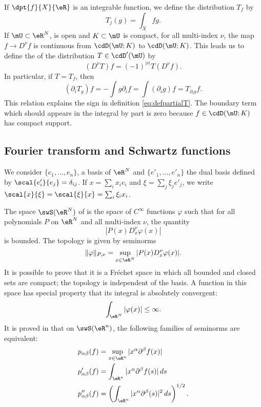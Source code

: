 If $\dpt{f}{X}{\eR}$ is an integrable function, we define the distribution $T_f$ by 
\[
	T_j(g)=\int_Xfg.
\]
If $\mU\subset\eR^N$, is open and $K\subset\mU$ is compact, for all multi-index $\nu$, the map $f\to D^{\nu}f$ is continuous from $\cdD(\mU;K)$ to $\cdD(\mU;K)$. This leads us to define the  of the distribution $T\in\cdD'(\mU)$ by
\begin{equation} \label{eq:defpartialT}
	(D^{\nu}T)f=(-1)^{| \nu |}T(D^{\nu}f).
\end{equation}
In particular, if $T=T_f$, then
\begin{equation} \label{eq:defTpri}
	(\partial_iT_g)f=-\int g\partial_if
	=\int(\partial_ig)f
	=T_{\partial_ig}f.
\end{equation}
This relation explains the sign in definition \eqref{eq:defpartialT}. The boundary term which should appears in the integral by part is zero because $f\in\cdD(\mU;K)$ has compact support.

\subsection{Fourier transform and Schwartz functions}

We consider $\{ e_1,\ldots,e_n \}$, a basis of $\eR^N$ and $\{ e'_1,\ldots,e'_n \}$ the dual basis defined by $\scal{e'_i}{e_j}=\delta_{ij}$. If $x=\sum_ix_ie_i$ and $\xi=\sum_j\xi_je'_j$, we write $\scal{x}{\xi}=\scal{\xi}{x}=\sum_i\xi_ix_i$.

The space $\swS(\eR^N)$\label{not_swS} of  is the space of $ C^{\infty}$ functions $\varphi$ such that for all polynomials $P$ on $\eR^N$ and all multi-index $\nu$, the quantity
\begin{equation}
	| P(x)D_x^{\nu}\varphi(x) |
\end{equation}
is bounded.  The topology is given by seminorms
\begin{equation}
	\| \varphi \|_{P,\nu}=\sup_{x\in\eR^N}| P(x)D_x^{\nu}\varphi(x) |.
\end{equation}
It is possible to prove that it is a Fréchet space in which all bounded and closed sets are compact; the topology is independent of the basis. A function in this space has special property that its integral is absolutely convergent:
\[
	\int_{\eR^N}| \varphi(x) |\leq \infty.
\]
It is proved in \cite{Kirillov} that on $\swS(\eR^n)$, the following families of seminorms are equivalent:
\begin{subequations}
	\begin{align}
		p_{\alpha\beta}(f)   & =\sup_{x\in\eR^n}| x^{\alpha}\partial^{\beta}f(x) |                        \\
		p'_{\alpha\beta}(f)  & =\int_{\eR^n}| x^{\alpha}\partial^{\beta}f(s) |\,ds                        \\
		p''_{\alpha\beta}(f) & =\left( \int_{\eR^n}| x^{\alpha}\partial^{\beta}(s) |^2\,ds \right)^{1/2}.
	\end{align}
\end{subequations}

